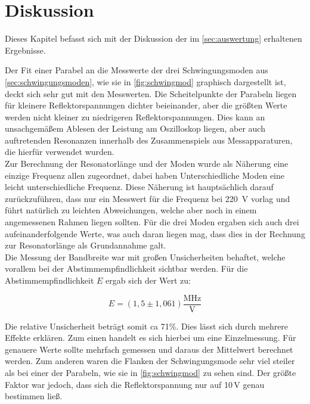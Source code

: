 

\section{Diskussion}
\label{sec:Diskussion}

Dieses Kapitel befasst sich mit der Diskussion der im \autoref{sec:auswertung} erhaltenen Ergebnisse.



Der Fit einer Parabel an die Messwerte der drei Schwingungsmoden aus \autoref{sec:schwingungsmoden}, wie sie in \autoref{fig:schwingmod} graphisch dargestellt ist, deckt sich sehr gut mit den Messwerten.
Die Scheitelpunkte der Parabeln liegen für kleinere Reflektorspannungen dichter beieinander, aber die größten Werte werden nicht kleiner zu niedrigeren Reflektorspannungen.
Dies kann an unsachgemäßem Ablesen der Leistung am Oszilloskop liegen, aber auch auftretenden Resonanzen innerhalb des Zusammenspiels aus Messapparaturen, die hierfür verwendet wurden.\\
Zur Berechnung der Resonatorlänge und der Moden wurde als Näherung eine einzige Frequenz allen zugeordnet, dabei haben Unterschiedliche Moden eine leicht unterschiedliche Frequenz.
Diese Näherung ist hauptsächlich darauf zurückzuführen, dass nur ein Messwert für die Frequenz bei \SI{220}{\volt} vorlag und führt natürlich zu leichten Abweichungen, welche aber noch in einem angemessenen Rahmen liegen sollten.
Für die drei Moden ergaben sich auch drei aufeinanderfolgende Werte, was auch daran liegen mag, dass dies in der Rechnung zur Resonatorlänge als Grundannahme galt.\\
Die Messung der Bandbreite war mit großen Unsicherheiten behaftet, welche vorallem bei der Abstimmempfindlichkeit sichtbar werden.
Für die Abstimmempfindlichkeit $E$ ergab sich der Wert zu:

\begin{equation}
E = (1,5 \pm 1,061) \frac{\text{MHz}}{\text{V}}
\label{eq:elbandbreite2}
\end{equation}

Die relative Unsicherheit beträgt somit ca 71\%. Dies lässt sich durch mehrere Effekte erklären. Zum einen handelt es sich hierbei um eine Einzelmessung.
Für genauere Werte sollte mehrfach gemessen und daraus der Mittelwert berechnet werden.
Zum anderen waren die Flanken der Schwingungsmode sehr viel steiler als bei einer der Parabeln, wie sie in \autoref{fig:schwingmod} zu sehen sind.
Der größte Faktor war jedoch, dass sich die Reflektorspannung nur auf 10\,V genau bestimmen ließ.\\

